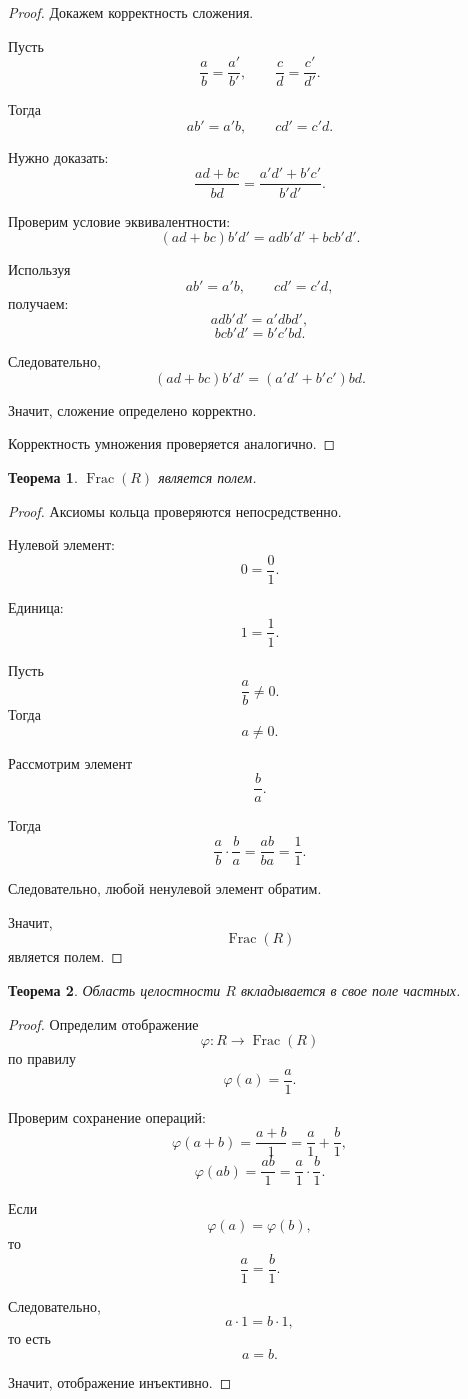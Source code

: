 \documentclass[12pt, a4paper]{article}
\newtheorem{theorem}{Теорема}
\theoremstyle{definition}
\theoremstyle{remark}
\begin{document}
\begin{proof}
	Докажем корректность сложения.
	
	Пусть
	\[
	\frac{a}{b}=\frac{a'}{b'},
	\qquad
	\frac{c}{d}=\frac{c'}{d'}.
	\]
	
	Тогда
	\[
	ab'=a'b,
	\qquad
	cd'=c'd.
	\]
	
	Нужно доказать:
	\[
	\frac{ad+bc}{bd}
	=
	\frac{a'd'+b'c'}{b'd'}.
	\]
	
	Проверим условие эквивалентности:
	\[
	(ad+bc)b'd'
	=
	adb'd'+bcb'd'.
	\]
	
	Используя
	\[
	ab'=a'b,
	\qquad
	cd'=c'd,
	\]
	получаем:
	\[
	adb'd'=a'dbd',
	\]
	\[
	bcb'd'=b'c'bd.
	\]
	
	Следовательно,
	\[
	(ad+bc)b'd'
	=
	(a'd'+b'c')bd.
	\]
	
	Значит, сложение определено корректно.
	
	Корректность умножения проверяется аналогично.
\end{proof}

\begin{theorem}
	$\operatorname{Frac}(R)$ является полем.
\end{theorem}

\begin{proof}
	Аксиомы кольца проверяются непосредственно.
	
	Нулевой элемент:
	\[
	0=\frac{0}{1}.
	\]
	
	Единица:
	\[
	1=\frac{1}{1}.
	\]
	
	Пусть
	\[
	\frac{a}{b}\ne0.
	\]
	Тогда
	\[
	a\ne0.
	\]
	
	Рассмотрим элемент
	\[
	\frac{b}{a}.
	\]
	
	Тогда
	\[
	\frac{a}{b}\cdot\frac{b}{a}
	=
	\frac{ab}{ba}
	=
	\frac{1}{1}.
	\]
	
	Следовательно, любой ненулевой элемент обратим.
	
	Значит,
	\[
	\operatorname{Frac}(R)
	\]
	является полем.
\end{proof}

\begin{theorem}
	Область целостности $R$ вкладывается в свое поле частных.
\end{theorem}

\begin{proof}
	Определим отображение
	\[
	\varphi:R\to\operatorname{Frac}(R)
	\]
	по правилу
	\[
	\varphi(a)=\frac{a}{1}.
	\]
	
	Проверим сохранение операций:
	\[
	\varphi(a+b)
	=
	\frac{a+b}{1}
	=
	\frac{a}{1}+\frac{b}{1},
	\]
	\[
	\varphi(ab)
	=
	\frac{ab}{1}
	=
	\frac{a}{1}\cdot\frac{b}{1}.
	\]
	
	Если
	\[
	\varphi(a)=\varphi(b),
	\]
	то
	\[
	\frac{a}{1}=\frac{b}{1}.
	\]
	
	Следовательно,
	\[
	a\cdot1=b\cdot1,
	\]
	то есть
	\[
	a=b.
	\]
	
	Значит, отображение инъективно.
\end{proof}
\end{document}
